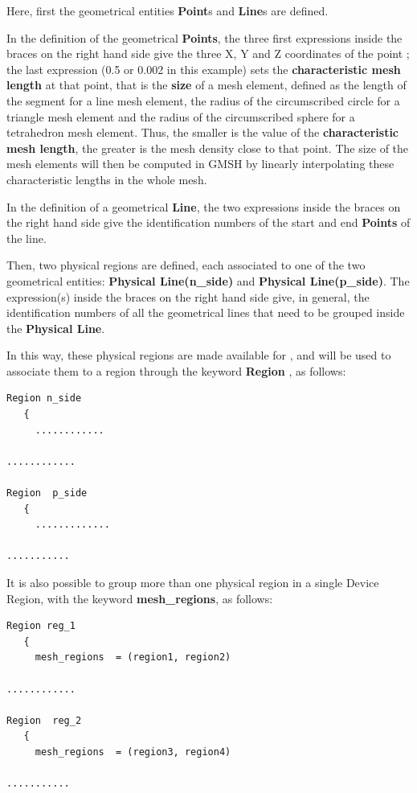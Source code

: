 Here,  first the   geometrical  entities  \textbf{Point}s  and  \textbf{Line}s  are  defined. 

In the definition of the geometrical \textbf{Points},  the three first expressions inside the braces on the right hand side give the three X, Y and Z coordinates of the point ; the last expression (0.5 or  0.002 in  this  example) sets the \textbf{characteristic mesh length} at that point, that is the \textbf{size} of a mesh element, defined as the length of the segment for a line mesh element, the radius of the circumscribed circle for a triangle mesh element and the radius of the circumscribed sphere for a tetrahedron mesh element.
Thus, the smaller is the value of the \textbf{characteristic mesh length}, the greater is the mesh density close to that point. The size of the mesh elements will
then be computed in GMSH by linearly interpolating these characteristic lengths in the whole mesh.

In the definition of a geometrical \textbf{Line},  the two expressions inside the braces on the right hand side  give the identification numbers of the start and end \textbf{Points} of the line.


 Then,  two  physical  regions are  defined, each  associated to  one  of  the  two  geometrical  entities:  \textbf{Physical Line(n\_side)}  and \textbf{ Physical Line(p\_side)}. 
The expression(s) inside the braces on the right hand side  give, in general, the identification numbers of all the geometrical lines that need to be grouped inside the \textbf{Physical Line}.

 In this  way,  these  physical  regions are made  available for  \TiberCAD{},  and  will be  used  to  associate them  to  a  \TiberCAD{} region through the  keyword \textbf{Region} ,  as  follows:
\begin{verbatim}
Region n_side
   {
     ............

............

Region  p_side 
   {
     .............

...........
\end{verbatim}


It  is also possible  to  group more than  one  physical region in a  single  Device  Region,  with the  keyword \textbf{mesh\_regions},  as  follows:


\begin{verbatim}
Region reg_1
   {
     mesh_regions  = (region1, region2)

............

Region  reg_2
   {
     mesh_regions  = (region3, region4)

...........
\end{verbatim}

